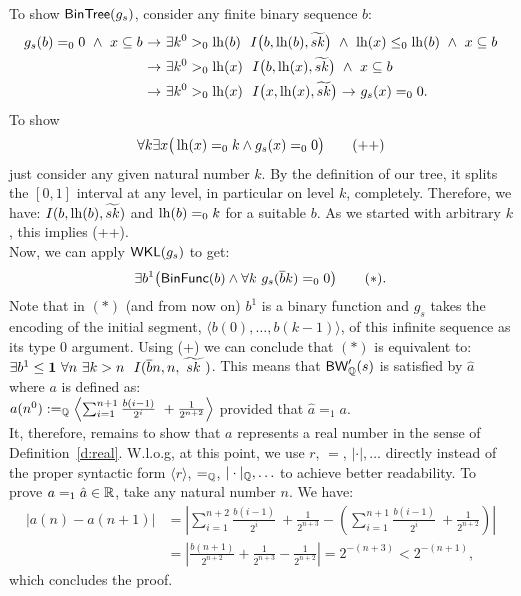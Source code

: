 To show $\textsf{\upshape BinTree}(g_s)$, consider any finite binary sequence $b$:
\begin{align*}
  g_s(b)=_00\ \wedge\ x\subseteq b 
           &{\ \rightarrow\ }  \exists k^0>_0\lh(b)\ \ 
I\big( b,\lh(b),\widetilde{ sk }\big)\ \wedge\ 
                              \lh(x)\leq_0\lh(b)\ \wedge\ 
                              x\subseteq b \\
               &{\ \rightarrow\ } \exists k^0>_0\lh(x)\ \ 
I\big( b,\lh(x),\widetilde{ sk }\big)\ \wedge\ 
                              x\subseteq b\  \\
               &{\ \rightarrow\ } \exists k^0>_0\lh(x)\ \ 
I\big( x,\lh(x),\widetilde{ sk }\big)
               {\ \rightarrow\ }g_s(x)=_00
\text{.}
\end{align*}
To show 
\[
\forall k\exists x \big(\operatorname{lh}(x)=_0k \wedge g_s(x)=_00\big) \tag{++}
\]
just consider any given 
natural number $k$. By the definition of our tree, it splits the $[0,1]$ 
interval at any level, in particular on level $k$, completely. 
Therefore, we have: $I( b, \operatorname{lh}(b), \widetilde{ sk })$ and $ \operatorname{lh}(b)=_0k$ for 
a suitable $b.$  
As we started with arbitrary $k$, this implies (++).\\
Now, we can apply $\textsf{\upshape WKL}(g_s)$ to get:
\[
\exists b^1 \big(\textsf{\upshape BinFunc}(b) \wedge \forall k\ g_s(\overline{b}k)=_00\big) 
\tag{$*$}
\text{.}
\]
Note that in $(*)$ (and from now on) $b^1$ is 
a binary function and $g_s$ takes
the encoding of the initial segment, $\langle b(0),\ldots,b(k-1)\rangle$, 
of this infinite sequence as its type $0$ argument.
Using (+) we can conclude that $(*)$ is equivalent to:
$
\exists b^1\leq\one\ \forall n\ \exists k> n\ \ I(\overline{b}n,n,
\widetilde{\ sk\ })
$. This means that $\textsf{\upshape BW}_{\mathbb{Q}}'(s)$ is satisfied by $\hat a$ where 
$a$ is defined as:\\
$
a(n^0):=_{\mathbb{Q}} \left\langle \sum_{i=1}^{n+1} \frac{b(i-1)}{2^i}\ +
               \frac{1}{2^{n+2}}\right\rangle
$ provided that $\widehat{a}=_1 a.$ \\%
It, therefore, remains to show that $a$ represents a real 
number in the sense of Definition~\ref{d:real}.
W.l.o.g, at this point, we use $r$, $=$, $|\cdot|, \ldots$ directly
instead of the proper syntactic form $\langle r\rangle$, 
$=_{\mathbb{Q}}$, $|\cdot|_{\mathbb{Q}},\ldots$ to achieve better readability.
To prove $a=_1\hat a\in\mathbb{R}$, 
take any natural number $n$. We have:
\begin{align*}
|a(n)-a(n+1)|&=
\left|
\sum_{i=1}^{n+2} \frac{b(i-1)}{2^i}\ +
 \frac{1}{2^{n+3}}
-
\left(\sum_{i=1}^{n+1} \frac{b(i-1)}{2^i}\ +
 \frac{1}{2^{n+2}}\right)
\right|
\\
&=
\left|
\frac{b(n+1)}{2^{n+2}}+\frac{1}{2^{n+3}}
-
\frac{1}{2^{n+2}}
\right|
=
2^{-(n+3)} < 2^{-(n+1)}
\text{,}
\end{align*}
which concludes the proof.\\
%
%

